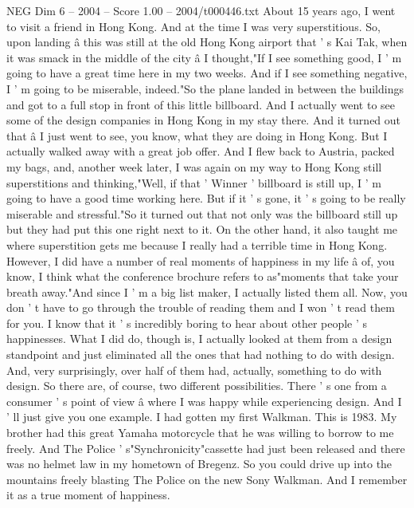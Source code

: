\begin{textsample}{NEG Dim 6 – 2004 – Score 1.00 – 2004/t000446.txt}  \label{ex:f6_neg_053}
About 15 years ago, I went to visit a friend in Hong Kong.
And at the time I was very superstitious.
So, upon landing â this was still at the old Hong Kong airport that ' s Kai Tak, when it was smack in the middle of the city â I thought,"If I see something good, I ' m going to have a great time here in my two weeks.
And if I see something negative, I ' m going to be miserable, indeed."So the plane landed in between the buildings and got to a full stop in front of this little billboard.
And I actually went to see some of the design companies in Hong Kong in my stay there.
And it turned out that â I just went to see, you know, what they are doing in Hong Kong.
But I actually walked away with a great job offer.
And I flew back to Austria, packed my bags, and, another week later, I was again on my way to Hong Kong still superstitions and thinking,"Well, if that ' Winner ' billboard is still up, I ' m going to have a good time working here.
But if it ' s gone, it ' s going to be really miserable and stressful."So it turned out that not only was the billboard still up but they had put this one right next to it.
On the other hand, it also taught me where superstition gets me because I really had a terrible time in Hong Kong.
However, I did have a number of real moments of happiness in my life â of, you know, I think what the conference brochure refers to as"moments that take your breath away."And since I ' m a big list maker, I actually listed them all.
Now, you don ' t have to go through the trouble of reading them and I won ' t read them for you.
I know that it ' s incredibly boring to hear about other people ' s happinesses.
What I did do, though is, I actually looked at them from a design standpoint and just eliminated all the ones that had nothing to do with design.
And, very surprisingly, over half of them had, actually, something to do with design.
So there are, of course, two different possibilities.
There ' s one from a consumer ' s point of view â where I was happy while experiencing design.
And I ' ll just give you one example.
I had gotten my first Walkman.
This is 1983.
My brother had this great Yamaha motorcycle that he was willing to borrow to me freely.
And The Police ' s"Synchronicity"cassette had just been released and there was no helmet law in my hometown of Bregenz.
So you could drive up into the mountains freely blasting The Police on the new Sony Walkman.
And I remember it as a true moment of happiness.

\end{textsample}
